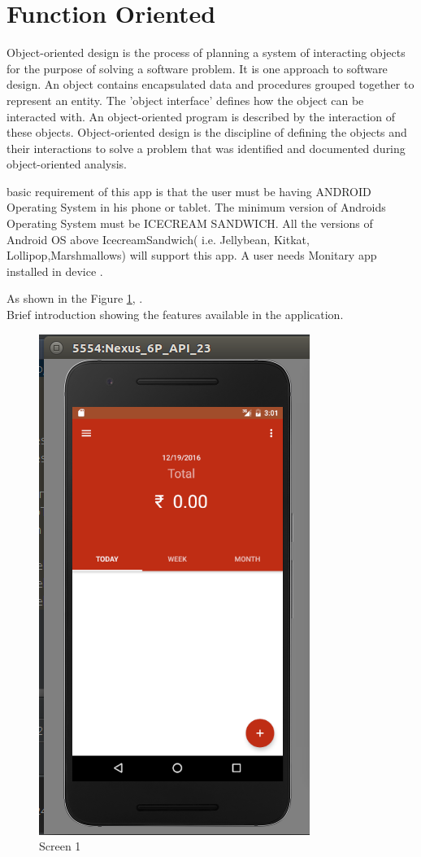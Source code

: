 \section{Function Oriented}

Object-oriented design is the process of planning a system of interacting objects for the purpose of solving a software problem. It is one approach to software design. An object contains encapsulated data and procedures grouped together to represent an entity. The 'object interface' defines how the object can be interacted with. An object-oriented program is described by the interaction of these objects. Object-oriented design is the discipline of defining the objects and their interactions to solve a problem that was identified and documented during object-oriented analysis.

\iffalse
 basic requirement of this app is that the user must be having ANDROID
Operating System in his phone or tablet. The minimum version of Androids Operating
System must be ICECREAM SANDWICH. All the versions of Android OS above
IcecreamSandwich( i.e. Jellybean, Kitkat, Lollipop,Marshmallows) will support this
app. A user needs Monitary app installed in device .


\noindent As shown in the Figure \ref{fig:1}, .\\Brief introduction showing the features available in the application.

\begin{figure}[ht]
\centering
\includegraphics[scale=0.5]{images/s1.png}
\caption{Screen 1}
\label{fig:1}
\end{figure}

